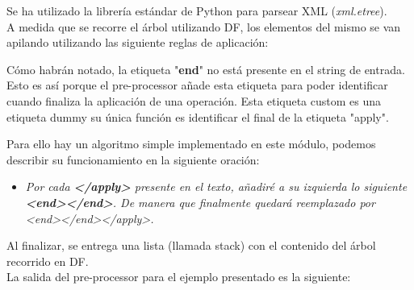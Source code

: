Se ha utilizado la librería estándar de Python para parsear XML (\textit{xml.etree}).\\

A medida que se recorre el árbol utilizando DF, los elementos del mismo se van apilando utilizando las siguiente reglas de aplicación:


Cómo habrán notado, la etiqueta "\textbf{end}" no está presente en el string de entrada. Esto es así porque el pre-processor añade esta etiqueta para poder identificar cuando finaliza la aplicación de una operación.
Esta etiqueta custom es una etiqueta dummy su única función es identificar el final de la etiqueta "apply".

Para ello hay un algoritmo simple implementado en este módulo, podemos describir su funcionamiento en la siguiente oración:

\begin{itemize}
\item \textit{Por cada \textbf{</apply>} presente en el texto, añadiré a su izquierda lo siguiente \textbf{<end></end>}. De manera que finalmente quedará reemplazado por <end></end></apply>.}
\end{itemize}

Al finalizar, se entrega una lista (llamada stack) con el contenido del árbol recorrido en DF.\\[0.01cm]

La salida del pre-processor para el ejemplo presentado es la siguiente:\\[0.01cm]

